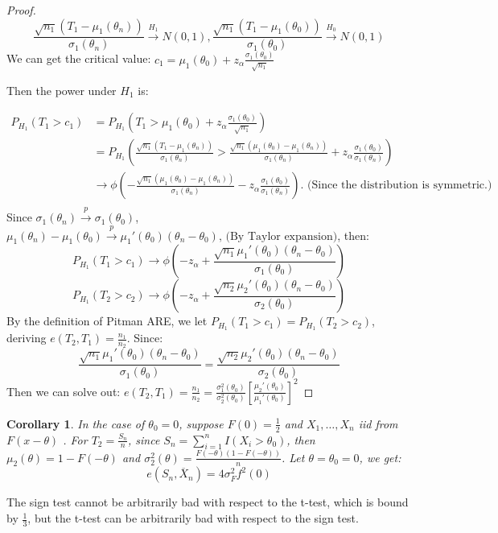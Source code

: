 \documentclass{ctexart}
\newtheorem{corollary}{Corollary}[subsection]
\begin{document}
\begin{proof}
\[
\frac{\sqrt{n_{1}}(T_{1}-\mu_{1}(\theta_{n}))}{\sigma_{1}(\theta_{n})}\xrightarrow{H_{1}}N(0,1),\frac{\sqrt{n_{1}}(T_{1}-\mu_{1}(\theta_{0}))}{\sigma_{1}(\theta_{0})}\xrightarrow{H_{0}}N(0,1)
\]   
We can get the critical value: \(c_{1}=\mu_{1}(\theta_{0})+z_{\alpha}\frac{\sigma_{1}(\theta_{0})}{\sqrt{n_{1}}}\) 

Then the power under \(H_{1}\) is: 

\begin{align*}
  P_{H_{1}}(T_{1}>c_{1})&=P_{H_{1}}(T_{1}>\mu_{1}(\theta_{0})+z_{\alpha}\frac{\sigma_{1}(\theta_{0})}{\sqrt{n_{1}}})\\
  &=P_{H_{1}}(\frac{\sqrt{n_{1}}(T_{1}-\mu_{1}(\theta_{n}))}{\sigma_{1}(\theta_{n})}>\frac{\sqrt{n_{1}}(\mu_{1}(\theta_{0})-\mu_{1}(\theta_{n}))}{\sigma_{1}(\theta_{n})}+z_{\alpha}\frac{\sigma_{1}(\theta_{0})}{\sigma_{1}(\theta_{n})})\\\
  &\to\phi(-\frac{\sqrt{n_{1}}(\mu_{1}(\theta_{0})-\mu_{1}(\theta_{n}))}{\sigma_{1}(\theta_{n})}-z_{\alpha}\frac{\sigma_{1}(\theta_{0})}{\sigma_{1}(\theta_{n})})\text{. (Since the distribution is symmetric.)}\\ 
\end{align*}
Since \(\sigma_{1}(\theta_{n})\xrightarrow{p}\sigma_{1}(\theta_{0})\), \(\mu_{1}(\theta_{n})-\mu_{1}(\theta_{0})\xrightarrow{p}\mu_{1}'(\theta_{0})(\theta_{n}-\theta_{0})\text{, (By Taylor expansion)}\), then: 
\[
P_{H_{1}}(T_{1}>c_{1})\to \phi(-z_{\alpha}+\frac{\sqrt{n_{1}}\mu_{1}'(\theta_{0})(\theta_{n}-\theta_{0})}{\sigma_{1}(\theta_{0})})
\] 
\[
P_{H_{1}}(T_{2}>c_{2})\to \phi(-z_{\alpha}+\frac{\sqrt{n_{2}}\mu_{2}'(\theta_{0})(\theta_{n}-\theta_{0})}{\sigma_{2}(\theta_{0})})
\] 
By the definition of Pitman ARE, we let \(P_{H_{1}}(T_{1}>c_{1})=P_{H_{1}}(T_{2}>c_{2})\), deriving \(e(T_{2},T_{1})=\frac{n_{1}}{n_{2}}\).  
Since: 
\[
\frac{\sqrt{n_{1}}\mu_{1}'(\theta_{0})(\theta_{n}-\theta_{0})}{\sigma_{1}(\theta_{0})}=
\frac{\sqrt{n_{2}}\mu_{2}'(\theta_{0})(\theta_{n}-\theta_{0})}{\sigma_{2}(\theta_{0})}
\] 
Then we can solve out: \(e(T_{2},T_{1})=\frac{n_{1}}{n_{2}}=\frac{\sigma_{1}^{2}(\theta_{0})}{\sigma_{2}^{2}(\theta_{0})}[\frac{\mu_{2}'(\theta_{0})}{\mu_{1}'(\theta_{0})}]^{2}\) 
\end{proof}

\begin{corollary}
  In the case of \(\theta_{0}=0\), suppose \(F(0)=\frac{1}{2}\) and \(X_{1},\ldots,X_{n}\) iid from \(F(x-\theta)\)  . For \(T_{2}=\frac{S_{n}}{n}\), since \(S_{n}=\sum_{i=1}^{n} I(X_{i}>\theta_{0})\), then \(\mu_{2}(\theta)=1-F(-\theta)\) and \(\sigma_{2}^{2}(\theta)=\frac{F(-\theta)(1-F(-\theta))}{n}\). Let \(\theta=\theta_{0}=0\), we get: 
  \[
  e(S_{n},\overline{X}_{n})=4\sigma_{F}^{2}f^{2}(0)
  \]      
\end{corollary}
The sign test cannot be arbitrarily bad with respect to the t-test, which is bound by $\frac{1}{3}$, but the t-test can be arbitrarily bad with respect to the sign test.
\end{document}
